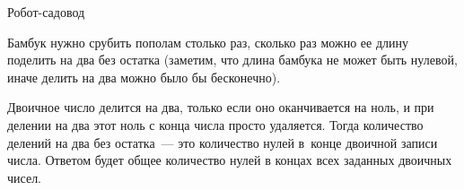 \begin{tutorial}{Робот-садовод}

Бамбук нужно срубить пополам столько раз, сколько раз можно ее длину поделить на два без остатка (заметим, что длина бамбука не может быть нулевой, иначе делить на два можно было бы бесконечно). 

Двоичное число делится на два, только если оно оканчивается на ноль, и при делении на два этот ноль с конца числа просто удаляется. Тогда количество делений на два без остатка~--- это количество нулей в~конце двоичной записи числа. Ответом будет общее количество нулей в концах всех заданных двоичных чисел.

\end{tutorial}
